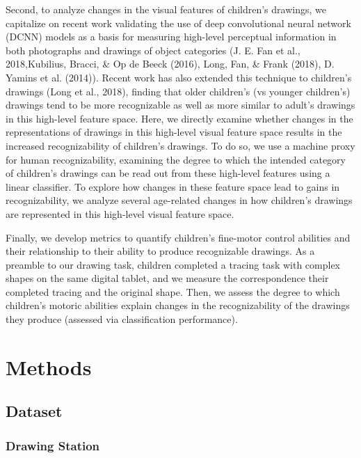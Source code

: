 \documentclass[10pt, letterpaper]{article}
\begin{document}
Second, to analyze changes in the visual features of children's
drawings, we capitalize on recent work validating the use of deep
convolutional neural network (DCNN) models as a basis for measuring
high-level perceptual information in both photographs and drawings of
object categories (J. E. Fan et al., 2018,Kubilius, Bracci, \& Op de
Beeck (2016), Long, Fan, \& Frank (2018), D. Yamins et al. (2014)).
Recent work has also extended this technique to children's drawings
(Long et al., 2018), finding that older children's (vs younger
children's) drawings tend to be more recognizable as well as more
similar to adult's drawings in this high-level feature space. Here, we
directly examine whether changes in the representations of drawings in
this high-level visual feature space results in the increased
recognizability of children's drawings. To do so, we use a machine proxy
for human recognizability, examining the degree to which the intended
category of children's drawings can be read out from these high-level
features using a linear classifier. To explore how changes in these
feature space lead to gains in recognizability, we analyze several
age-related changes in how children's drawings are represented in this
high-level visual feature space.

Finally, we develop metrics to quantify children's fine-motor control
abilities and their relationship to their ability to produce
recognizable drawings. As a preamble to our drawing task, children
completed a tracing task with complex shapes on the same digital tablet,
and we measure the correspondence their completed tracing and the
original shape. Then, we assess the degree to which children's motoric
abilities explain changes in the recognizability of the drawings they
produce (assessed via classification performance).

\section{Methods}\label{methods}

\subsection{Dataset}\label{dataset}

\subsubsection{Drawing Station}\label{drawing-station}
\end{document}
